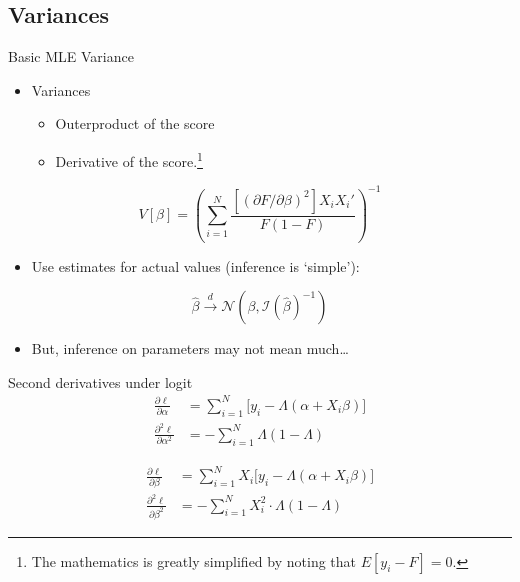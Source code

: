 \documentclass[
  ignorenonframetext,
]{beamer}
\providecommand{\tightlist}{%
  \setlength{\itemsep}{0pt}\setlength{\parskip}{0pt}}
\begin{document}
\subsection{Variances}\label{variances}

\begin{frame}{Basic MLE Variance}
\protect{}\label{basic-mle-variance}
\begin{itemize}
\tightlist
\item
  Variances

  \begin{itemize}
  \tightlist
  \item
    Outerproduct of the score
  \item
    Derivative of the
    score.\footnote{The mathematics is greatly simplified by noting that $E[y_i-F]=0$.}
  \end{itemize}
\end{itemize}

\[
V[\beta] = \left( \sum_{i=1}^N \frac{[(\partial F/ \partial \beta)^2]
    X_i X_i'}{F(1-F)} \right)^{-1}
\]

\begin{itemize}
\tightlist
\item
  Use estimates for actual values (inference is `simple'):
\end{itemize}

\[
\hat{\beta} \xrightarrow{d} \mathcal{N}(\beta, \mathcal{I}(\hat{\beta})^{-1})
\]

\begin{itemize}
\tightlist
\item
  But, inference on parameters may not mean much\ldots{}
\end{itemize}
\end{frame}

\begin{frame}{Second derivatives under logit}
\protect{}\label{second-derivatives-under-logit}
\[
\begin{split}
\frac{\partial \ell}{\partial \alpha} &=  \sum_{i=1}^N  \big[ y_i - \Lambda(\alpha + X_i \beta) \big] \\
\frac{\partial^2 \ell}{\partial \alpha^2} &= - \sum_{i=1}^N \Lambda(1-\Lambda)
\end{split}
\]

\[
\begin{split}
\frac{\partial \ell}{\partial \beta} &= \sum_{i=1}^N X_i \big[y_i - \Lambda(\alpha + X_i \beta) \big]  \\
\frac{\partial^2 \ell}{\partial \beta^2} &= - \sum_{i=1}^N X_i^2 \cdot \Lambda(1-\Lambda)
\end{split}
\]
\end{frame}
\end{document}

